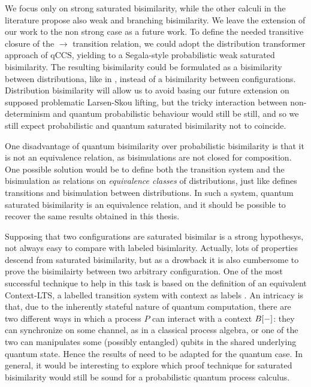 We focus only on strong saturated bisimilarity, while the other calculi in the literature propose also weak and branching bisimilarity. We leave the extension of our work to the non strong case as a future work. To define the needed transitive closure of the $\rightarrow$ transition relation, we could adopt the distribution transformer approach of qCCS, yielding to a Segala-style probabilistic weak saturated bisimilarity. The resulting bisimilarity could be formulated as a bisimilarity between distributiona, like in \cite{hennessyExploringProbabilisticBisimulations2012}, instead of a bisimilarity between configurations. Distribution bisimilarity will allow us to avoid basing our future extension on supposed
problematic Larsen-Skou lifting, but the tricky interaction between non-determinism and quantum probabilistic behaviour would still be still, and so we still expect probabilistic and quantum saturated bisimilarity not to coincide.

One disadvantage of quantum bisimilarity over probabilistic bisimilarity is that it is not an equivalence relation, as bisimulations are not closed for composition. One possible solution would be to define both the transition system and the bisimulation as relations on \textit{equivalence classes} of distributions, just like \cite{hennessyExploringProbabilisticBisimulations2012} defines transitions and bisimulation between distributions. In such a system, quantum saturated bisimilarity is an equivalence relation, and it should be possible to recover the same results obtained in this thesis.

Supposing that two configurations are saturated bisimilar is a strong hypothesys, not always easy to compare with labeled bisimlarity. Actually, lots of properties descend from saturated bisimilarity, but as a drowback it is also cumbersome to prove the bisimilairty between two arbitrary configuration. One of the most successful technique to help in this task is based on the definition of an equivalent Context-LTS, a labelled transition system with context as labels \cite{bonchiGeneralTheoryBarbs2014}. An intricacy is that, due to the inherently stateful nature of quantum computation, there are two different ways in which a process $P$ can interact with a context $B[{-}]$: they can synchronize on some channel, as in a classical process algebra, or one of the two can manipulates some (possibly entangled) qubits in the shared  underlying quantum state. Hence the results of \cite{bonchiGeneralTheoryBarbs2014} need to be adapted for the quantum case. In general, it would be interesting to explore which proof technique for saturated bisimilarity would still be sound for a probabilistic quantum process calculus.